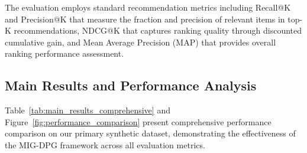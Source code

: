 \documentclass[pdflatex,sn-mathphys-num]{sn-jnl}%
\theoremstyle{thmstyleone}%
\theoremstyle{thmstyletwo}%
\theoremstyle{thmstylethree}%
\begin{document}
The evaluation employs standard recommendation metrics including Recall@K and Precision@K that measure the fraction and precision of relevant items in top-K recommendations, NDCG@K that captures ranking quality through discounted cumulative gain, and Mean Average Precision (MAP) that provides overall ranking performance assessment.

\subsection{Main Results and Performance Analysis}

Table~\ref{tab:main_results_comprehensive} and Figure~\ref{fig:performance_comparison} present comprehensive performance comparison on our primary synthetic dataset, demonstrating the effectiveness of the MIG-DPG framework across all evaluation metrics.
\end{document}
